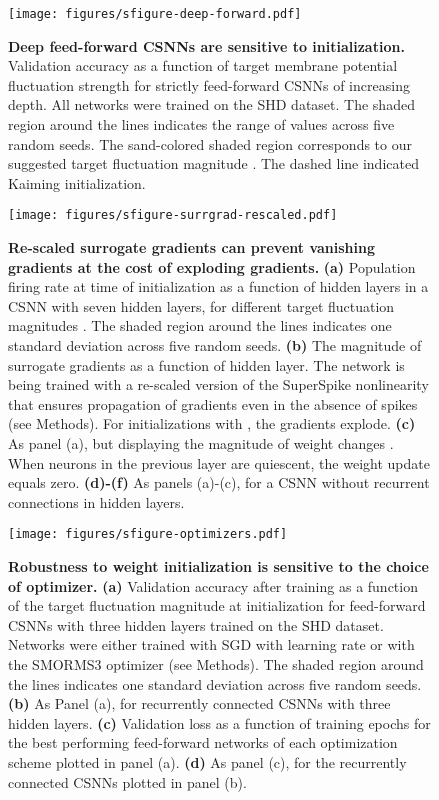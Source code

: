 \documentclass[11pt,a4paper]{article}
\begin{document}
\begin{refsection}
\begin{figure}[htb]
	\texttt{[image: figures/sfigure-deep-forward.pdf]}
\caption{
\textbf{Deep feed-forward \acp{CSNN} are sensitive to initialization.}
Validation accuracy as a function of target membrane potential fluctuation strength  for strictly feed-forward CSNNs of increasing depth. All networks were trained on the SHD dataset. The shaded region around the lines indicates the range of values across five random seeds. The sand-colored shaded region corresponds to our suggested target fluctuation magnitude . The dashed line indicated Kaiming initialization.
}
\label{sfig:deep-forward}
\end{figure}


\begin{figure}[htb]
	\texttt{[image: figures/sfigure-surrgrad-rescaled.pdf]}
\caption{
\textbf{Re-scaled surrogate gradients can prevent vanishing gradients
at the cost of exploding gradients.}
\textbf{(a)} Population firing rate at time of initialization  as a function of hidden layers in a \ac{CSNN} with seven hidden layers, for different target fluctuation magnitudes . The shaded region around the lines indicates one standard deviation across five random seeds.
\textbf{(b)} The magnitude of surrogate gradients  as a function of hidden layer. The network is being trained with a re-scaled version of the SuperSpike nonlinearity that ensures propagation of gradients even in the absence of spikes (see Methods). For initializations with , the gradients explode.
\textbf{(c)} As panel (a), but displaying the magnitude of weight changes . When neurons in the previous layer are quiescent, the weight update equals zero.
\textbf{(d)-(f)} As panels (a)-(c), for a \ac{CSNN} without recurrent connections in hidden layers.
}
\label{sfig:surrgrad-rescaled}
\end{figure}

\begin{figure}[htb]
	\texttt{[image: figures/sfigure-optimizers.pdf]}
\caption{
\textbf{Robustness to weight initialization is sensitive to the choice of optimizer.}
	\textbf{(a)} Validation accuracy after training as a function of the target fluctuation magnitude  at initialization for feed-forward \acp{CSNN} with three hidden layers trained on the SHD dataset. Networks were either trained with \ac{SGD} with learning rate  or with the SMORMS3 optimizer (see Methods). The shaded region around the lines indicates one standard deviation across five random seeds.
	\textbf{(b)} As Panel (a), for recurrently connected \acp{CSNN} with three hidden layers.
	\textbf{(c)} Validation loss as a function of training epochs for the best performing feed-forward networks of each optimization scheme plotted in panel (a).
	\textbf{(d)} As panel (c), for the recurrently connected \acp{CSNN} plotted in panel (b).
}
\label{sfig:optimizers}
\end{figure}


\end{refsection}
\end{document}
